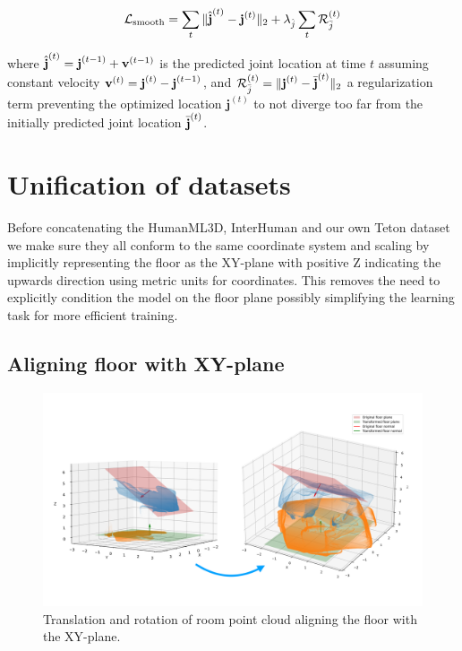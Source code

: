 \begin{equation}
    \mathcal{L}_\text{smooth} = \sum_t{\| \hat{\boldsymbol{\mathbf{j}}}^{(t)} - \boldsymbol{\mathbf{j}}^{(t)} \|_2} + \lambda_{\hat{j}} \sum_t{\mathcal{R}_{\bar{j}}^{(t)}}
\end{equation}

where $\hat{\boldsymbol{\mathbf{j}}}^{(t)} = \boldsymbol{\mathbf{j}}^{(t-1)} + \boldsymbol{\mathbf{v}}^{(t-1)}$ is the predicted joint location at time $t$ assuming constant velocity $\boldsymbol{\mathbf{v}}^{(t)} = \boldsymbol{\mathbf{j}}^{(t)} - \boldsymbol{\mathbf{j}}^{(t-1)}$, and $\mathcal{R}_{\bar{j}}^{(t)} = \| \boldsymbol{\mathbf{j}}^{(t)} - \bar{\boldsymbol{\mathbf{j}}}^{(t)} \|_2$ a regularization term preventing the optimized location $\mathbf{j}^{(t)}$ to not diverge too far from the initially predicted joint location $\bar{\boldsymbol{\mathbf{j}}}^{(t)}$.





\section{Unification of datasets}
Before concatenating the HumanML3D, InterHuman and our own Teton dataset we make sure they all conform to the same coordinate system and scaling by implicitly representing the floor as the XY-plane with positive Z indicating the upwards direction using metric units for coordinates. This removes the need to explicitly condition the model on the floor plane possibly simplifying the learning task for more efficient training.


\subsection*{Aligning floor with XY-plane}
\begin{figure}[H]
    \centering
    \includegraphics[width=\linewidth]{figures/rotation.pdf}
    \caption{Translation and rotation of room point cloud aligning the floor with the XY-plane.}
    \label{fig:rotate-floor-planes}
\end{figure}

